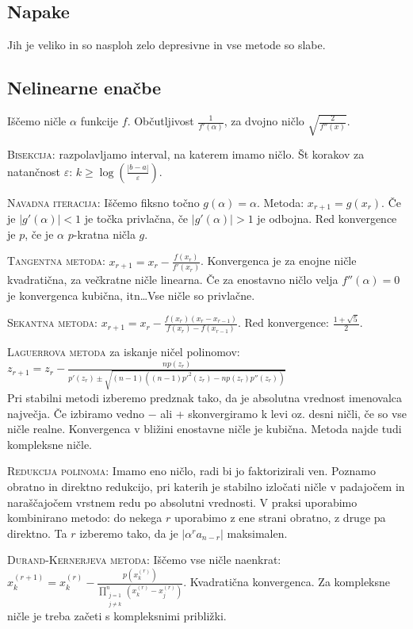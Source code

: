 \documentclass[a4paper,10pt]{article}
\title{\mytitle}
\author{Jure Slak}
\date{\today}
\theoremstyle{definition}
\begin{document}
\subsection*{Napake}
Jih je veliko in so nasploh zelo depresivne in vse metode so slabe.

\subsection*{Nelinearne enačbe}
Iščemo ničle $\alpha$ funkcije $f$. Občutljivost $\frac{1}{f'(\alpha)}$, za
dvojno ničlo $\sqrt{\frac{2}{f''(x)}}$.

\textsc{Bisekcija:} razpolavljamo interval, na katerem imamo ničlo. Št korakov za
natančnost $\varepsilon$: $k \geq \log\left(\frac{|b-a|}{\varepsilon}\right)$.

\textsc{Navadna iteracija:} Iščemo fiksno točno $g(\alpha) = \alpha$. Metoda: $x_{r+1} =
g(x_r)$. Če je $|g'(\alpha)| < 1$ je točka privlačna, če $|g'(\alpha)| > 1$ je
odbojna. Red konvergence je $p$, če je $\alpha$ $p$-kratna ničla $g$.

\textsc{Tangentna metoda:} $x_{r+1} = x_r - \frac{f(x_r)}{f'(x_r)}$. Konvergenca je za
enojne ničle kvadratična, za večkratne ničle linearna. Če za enostavno ničlo
velja $f''(\alpha) = 0$ je konvergenca kubična, itn\dots Vse ničle so privlačne.

\textsc{Sekantna metoda:} $x_{r+1} = x_r - \frac{f(x_r)(x_r - x_{r-1})}{f(x_r) -
f(x_{r-1})}$. Red konvergence: $\frac{1+\sqrt{5}}{2}$.

\textsc{Laguerrova metoda} za iskanje ničel polinomov: $z_{r+1} = z_r -
\frac{np(z_r)}{p'(z_r) \pm \sqrt{(n-1)((n-1)p'^2(z_r) - np(z_r)p''(z_r))}}$ \\
Pri stabilni metodi izberemo predznak tako, da je absolutna vrednost imenovalca
največja. Če izbiramo vedno $-$ ali  + skonvergiramo k levi oz. desni ničli, če
so vse ničle realne. Konvergenca v bližini enostavne ničle je kubična. Metoda
najde tudi kompleksne ničle.

\textsc{Redukcija polinoma:} Imamo eno ničlo, radi bi jo faktorizirali ven.
Poznamo obratno in direktno redukcijo, pri katerih je stabilno izločati ničle v
padajočem in naraščajočem vrstnem redu po absolutni vrednosti. V praksi
uporabimo kombinirano metodo: do nekega $r$ uporabimo z ene strani obratno, z
druge pa direktno. Ta $r$ izberemo tako, da je $|\alpha^ra_{n-r}|$ maksimalen.

\textsc{Durand-Kernerjeva metoda:} Iščemo vse ničle naenkrat: $x_k^{(r+1)} =
x_k^{(r)} - \frac{p(x_k^{(r)})}{\prod_{\substack{j=1 \\ j \neq k}}^n (x_k^{(r)} -
x_j^{(r)})}$. Kvadratična konvergenca. Za kompleksne ničle je treba začeti s kompleksnimi približki.
\end{document}

